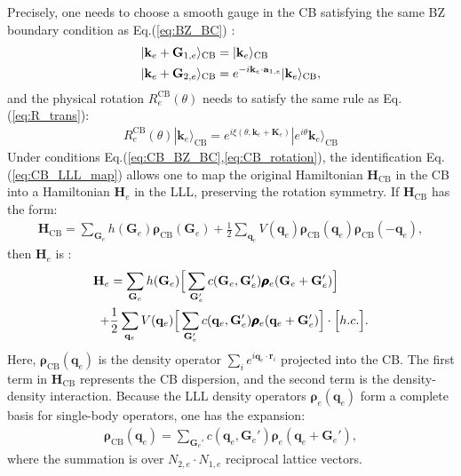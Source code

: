 Precisely, one needs to choose a smooth gauge in the CB satisfying the same BZ boundary condition as Eq.(\ref{eq:BZ_BC}) \cite{jian2013crystal}:
\begin{align}
|\mathbf k_e+\mathbf G_{1,e}\rangle_{\text{CB}}&=|\mathbf k_e\rangle_{\text{CB}}\notag\\
|\mathbf k_e+\mathbf G_{2,e}\rangle_{\text{CB}}&=e^{-i \mathbf k_e\cdot\mathbf a_{1,e}}|\mathbf k_e\rangle_{\text{CB}},\label{eq:CB_BZ_BC}
\end{align}
and the physical rotation $R^{\text{CB}}_e(\theta)$ needs to satisfy the same rule as Eq.(\ref{eq:R_trans}):
\begin{align}
R^{\text{CB}}_e(\theta)|\mathbf k_e\rangle_{\text{CB}}=e^{i \xi(\theta,\mathbf k_e+\mathbf K_e)}|e^{i\theta}\mathbf k_e\rangle_{\text{CB}}\label{eq:CB_rotation}
\end{align}
Under conditions Eq.(\ref{eq:CB_BZ_BC},\ref{eq:CB_rotation}), the identification Eq.(\ref{eq:CB_LLL_map}) allows one to map the original Hamiltonian $\mathbf H_{\text{CB}}$ in the CB into a Hamiltonian $\mathbf H_e$ in the LLL, preserving the rotation symmetry. If $\mathbf H_{\text{CB}}$ has the form:
\begin{align}
\mathbf H_{\text{CB}}=\sum_{\mathbf G_e} h(\mathbf G_e) \pmb{\boldsymbol\rho}_{\text{CB}}(\mathbf G_e)+\frac{1}{2}\sum_{\mathbf q_e} V(\mathbf q_e)\pmb{\boldsymbol\rho}_{\text{CB}}(\mathbf q_e)\pmb{\boldsymbol\rho}_{\text{CB}}(-\mathbf q_e),\label{eq:CB_H_e}
\end{align}
then $\mathbf H_e$ is \cite{murthy2012hamiltonian}:
\begin{align}
\mathbf H_e&=\sum_{\mathbf G_e} h(\mathbf G_e) \Big[\sum_{\mathbf G_e'}c(\mathbf G_e,\mathbf G_e')\pmb{\boldsymbol\rho}_{e}(\mathbf G_e+\mathbf G_e')\Big]\notag\\
+&\frac{1}{2}\sum_{\mathbf q_e} V(\mathbf q_e)\Big[\sum_{\mathbf G_e'}c(\mathbf q_e,\mathbf G_e')\pmb{\boldsymbol\rho}_{e}(\mathbf q_e+\mathbf G_e')\Big]\cdot\Big[h.c.\Big].\label{eq:H_e}
\end{align}
Here, $\pmb{\boldsymbol\rho}_{\text{CB}}(\mathbf q_e)$ is the density operator $\sum_i e^{i\mathbf q_e\cdot \bm{r}_i}$ projected into the CB. The first term in $\mathbf H_{\text{CB}}$ represents the CB dispersion, and the second term is the density-density interaction. Because the LLL density operators $\pmb{\boldsymbol\rho}_e(\mathbf q_e)$ form a complete basis for single-body operators, one has the expansion:
\begin{align}
\pmb{\boldsymbol\rho}_{\text{CB}}(\mathbf q_e)=\sum_{\mathbf G_e'}c(\mathbf q_e,\mathbf G_e')\pmb{\boldsymbol\rho}_{e}(\mathbf q_e+\mathbf G_e'),\label{eq:rho_CB}
\end{align}
where the summation is over $N_{2,e}\cdot N_{1,e}$ reciprocal lattice vectors.

